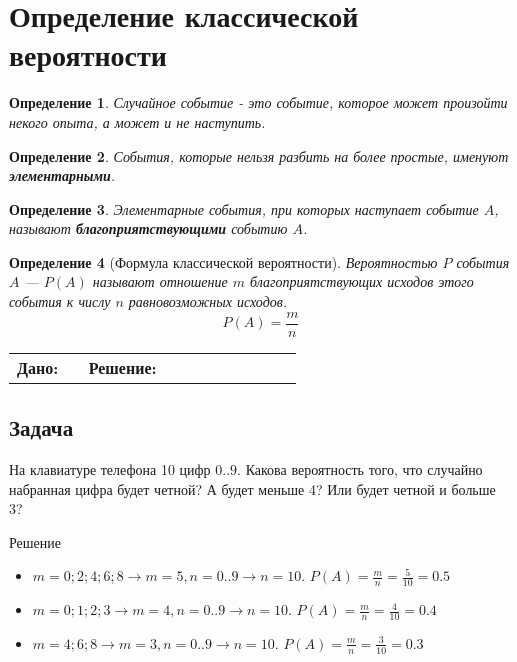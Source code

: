 \documentclass[a4paper,12pt]{article}
\newtheorem{define}{Определение}
\begin{document}
\section{Определение классической вероятности}

\begin{define}
Случайное событие - это событие, которое может произойти некого опыта, а может и не наступить.
\end{define}

\begin{define}
События, которые нельзя разбить на более простые, именуют \textbf{элементарными}.
\end{define}

\begin{define}
Элементарные события, при которых наступает событие $A$, называют \textbf{благоприятствующими} событию $A$.
\end{define}

\begin{define}[Формула классической вероятности]
Вероятностью $P$ события $A$ --- $P(A)$ называют отношение $m$ благоприятствующих исходов этого события к числу $n$  равновозможных исходов.
$$P(A)=\frac{m}{n}$$
\end{define}

\begin{tabular}{p{0.2\linewidth}|p{0.6\linewidth}}
{%
\textbf{Дано:}

} & {%
\textbf{Решение:}

}
\end{tabular}

\subsection{Задача}
На клавиатуре телефона 10 цифр ${0..9}$. Какова вероятность того, что случайно набранная цифра будет четной? А будет меньше 4? Или будет четной и больше 3?
\begin{center}
Решение
\end{center}
\begin{itemize}
	\item $m={0; 2; 4; 6; 8} \longrightarrow m=5, n={0..9} \longrightarrow n=10$. $P(A)=\frac{m}{n}=\frac{5}{10}=0.5$
	\item $m={0; 1; 2; 3} \longrightarrow m=4, n={0..9} \longrightarrow n=10$. $P(A)=\frac{m}{n}=\frac{4}{10}=0.4$
	\item $m={4; 6; 8} \longrightarrow m=3, n={0..9} \longrightarrow n=10$. $P(A)=\frac{m}{n}=\frac{3}{10}=0.3$
\end{itemize}
\end{document}
